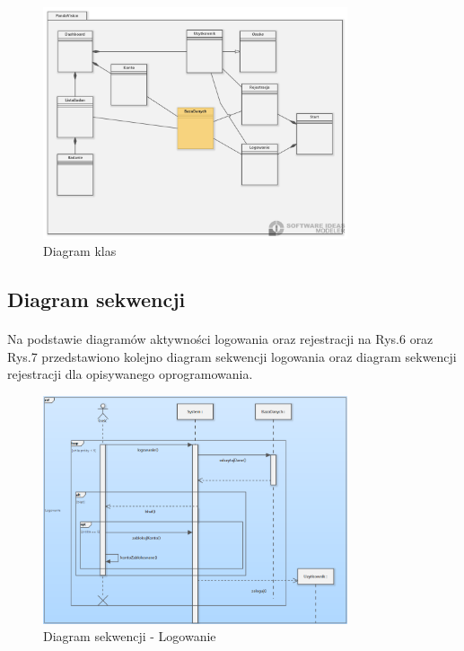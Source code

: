 \documentclass[12pt, letterpaper]{article}
\begin{document}
\begin{figure}[h]
  \centering
      \includegraphics[width=0.8\textwidth]{classDiagram}
  \caption{Diagram klas}
\end{figure}
		
\newpage		
\subsection{Diagram sekwencji}
\paragraph{}
Na podstawie diagramów aktywności logowania oraz rejestracji na Rys.6 oraz Rys.7 przedstawiono kolejno diagram sekwencji logowania oraz diagram sekwencji rejestracji dla opisywanego oprogramowania.
		
\begin{figure}[h]
  \centering
      \includegraphics[width=0.8\textwidth]{seqDiagram}
  \caption{Diagram sekwencji - Logowanie}
\end{figure}
\end{document}

